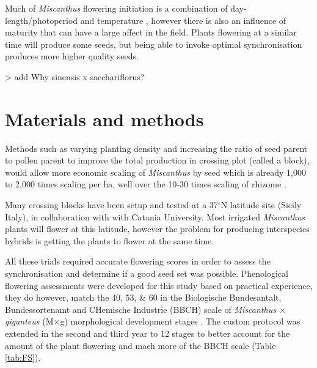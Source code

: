 \documentclass[fleqn, 15pt, lineno]{olplainarticle}
\begin{document}
Much of \textit{Miscanthus} flowering initiation is a combination of day-length/photoperiod and temperature \citep{Jensen2013,Jensen2011a}, however there is also an influence of maturity that can have a large affect in the field.
Plants flowering at a similar time will produce some seeds, but being able to invoke optimal synchronisation produces more higher quality seeds.


> add Why sinensis x sacchariflorus?


\FloatBarrier
\section{Materials and methods}
Methods such as varying planting density and increasing the ratio of seed parent to pollen parent to improve the total production in crossing plot (called a block), would allow more economic scaling of \textit{Miscanthus} by seed which is already 1,000 to 2,000 times scaling per ha, well over the 10-30 times scaling of rhizome \citep{Astley2017}.

Many crossing blocks have been setup and tested at a 37$^{\circ}$N latitude site (Sicily Italy), in collaboration with with Catania University.
Most irrigated \textit{Miscanthus} plants will flower at this latitude, however the problem for producing interspecies hybrids is getting the plants to flower at the same time.

All these trials required accurate flowering scores in order to assess the synchronisation and determine if a good seed set was possible.
Phenological flowering assessments were developed for this study based on practical experience, they do however, match the 40, 53, \& 60 in the Biologische Bundesantalt, Bundessortenamt and CHemische Industrie (BBCH) scale of \textit{Miscanthus $\times$ giganteus} (M$\times$g) morphological development stages \citep{Tejera2017}.
The custom protocol was extended in the second and third year to 12 stages to better account for the amount of the plant flowering and mach more of the BBCH scale (Table \ref{tab:FS}).
\end{document}
